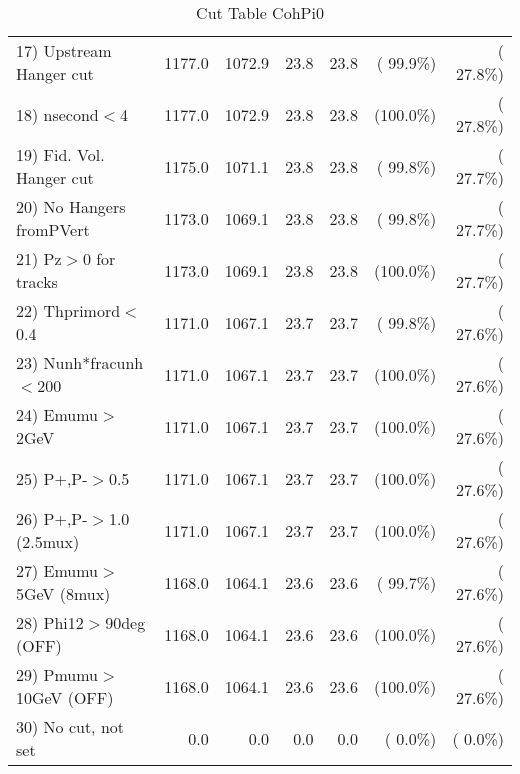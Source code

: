 \begin{table}[h!]
\begin{tabular}{||l||r|r|r|r|r|r||}
 17) Upstream Hanger cut  &       1177.0 &       1072.9 &         23.8 &         23.8 & ( 99.9\%) & ( 27.8\%) \\
 18) nsecond$<$4          &       1177.0 &       1072.9 &         23.8 &         23.8 & (100.0\%) & ( 27.8\%) \\
 19) Fid. Vol. Hanger cut &       1175.0 &       1071.1 &         23.8 &         23.8 & ( 99.8\%) & ( 27.7\%) \\
 20) No Hangers fromPVert &       1173.0 &       1069.1 &         23.8 &         23.8 & ( 99.8\%) & ( 27.7\%) \\
 21) Pz$>$0 for tracks    &       1173.0 &       1069.1 &         23.8 &         23.8 & (100.0\%) & ( 27.7\%) \\
 22) Thprimord$<$0.4      &       1171.0 &       1067.1 &         23.7 &         23.7 & ( 99.8\%) & ( 27.6\%) \\
 23) Nunh*fracunh$<$200   &       1171.0 &       1067.1 &         23.7 &         23.7 & (100.0\%) & ( 27.6\%) \\
 24) Emumu$>$2GeV         &       1171.0 &       1067.1 &         23.7 &         23.7 & (100.0\%) & ( 27.6\%) \\
 25) P+,P-$>$0.5          &       1171.0 &       1067.1 &         23.7 &         23.7 & (100.0\%) & ( 27.6\%) \\
 26) P+,P-$>$1.0 (2.5mux) &       1171.0 &       1067.1 &         23.7 &         23.7 & (100.0\%) & ( 27.6\%) \\
 27) Emumu$>$5GeV  (8mux) &       1168.0 &       1064.1 &         23.6 &         23.6 & ( 99.7\%) & ( 27.6\%) \\
 28) Phi12$>$90deg  (OFF) &       1168.0 &       1064.1 &         23.6 &         23.6 & (100.0\%) & ( 27.6\%) \\
 29) Pmumu$>$10GeV  (OFF) &       1168.0 &       1064.1 &         23.6 &         23.6 & (100.0\%) & ( 27.6\%) \\
 30) No cut, not set      &          0.0 &          0.0 &          0.0 &          0.0 & (  0.0\%) & (  0.0\%) \\
 \hline
 \hline
 \end{tabular}
 \caption{Cut Table  CohPi0   }
 \label{tab-cutheavy_neutrino_0.500}
 \end{table}
